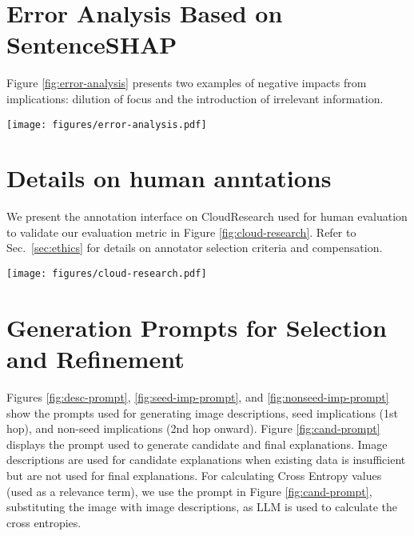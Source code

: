 \section{Error Analysis Based on SentenceSHAP}
Figure \ref{fig:error-analysis} presents two examples of negative impacts from implications: dilution of focus and the introduction of irrelevant information.
\label{app:error-analysis-shap}
\begin{figure*}[t]
  \texttt{[image: figures/error-analysis.pdf]} \hfill
  \caption {Examples of negative impact from implications from Phi (top) and GPT4o (bottom).}
  \label{fig:error-analysis}
\end{figure*}

\section{Details on human anntations}
\label{app:cloudresearch}
We present the annotation interface on CloudResearch used for human evaluation to validate our evaluation metric in Figure \ref{fig:cloud-research}. Refer to Sec.~\ref{sec:ethics} for details on annotator selection criteria and compensation.

\begin{figure*}[t]
  \texttt{[image: figures/cloud-research.pdf]} \hfill
  \caption {Annotation interface on CloudResearch used for human evaluation to validate our evaluation metric.}
  \label{fig:cloud-research}
\end{figure*}



\section{Generation Prompts for Selection and Refinement}
\label{app:gen-prompts}
Figures \ref{fig:desc-prompt}, \ref{fig:seed-imp-prompt}, and \ref{fig:nonseed-imp-prompt} show the prompts used for generating image descriptions, seed implications (1st hop), and non-seed implications (2nd hop onward). Figure \ref{fig:cand-prompt} displays the prompt used to generate candidate and final explanations. Image descriptions are used for candidate explanations when existing data is insufficient but are not used for final explanations. For calculating Cross Entropy values (used as a relevance term), we use the prompt in Figure \ref{fig:cand-prompt}, substituting the image with image descriptions, as LLM is used to calculate the cross entropies.

